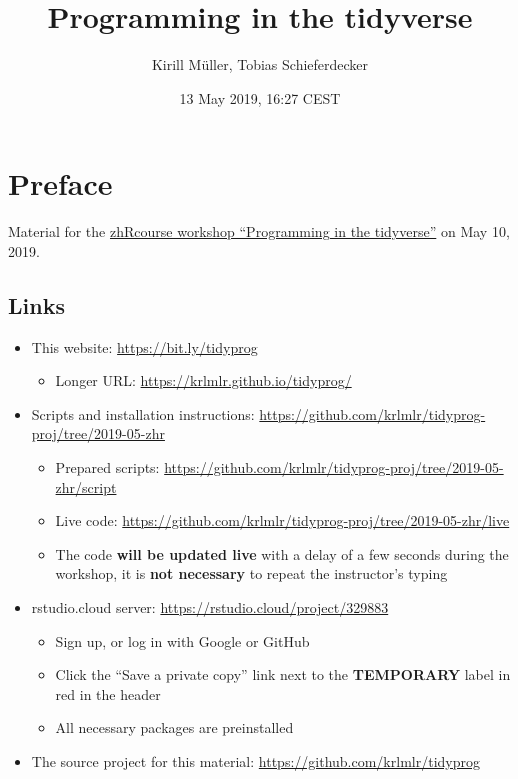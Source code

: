 \documentclass[]{book}
\title{Programming in the tidyverse}
\author{Kirill Müller, Tobias Schieferdecker}
\date{13 May 2019, 16:27 CEST}
\providecommand{\tightlist}{%
  \setlength{\itemsep}{0pt}\setlength{\parskip}{0pt}}
\begin{document}
\maketitle

{
\setcounter{tocdepth}{1}
\tableofcontents
}
\hypertarget{preface}{%
\chapter*{Preface}\label{preface}}

Material for the \href{https://www.zhrcourses.uzh.ch/en/programm2019/tidyverse.html}{zhRcourse workshop ``Programming in the tidyverse''} on May 10, 2019.

\hypertarget{links}{%
\section*{Links}\label{links}}

\begin{itemize}
\tightlist
\item
  This website: \url{https://bit.ly/tidyprog}

  \begin{itemize}
  \tightlist
  \item
    Longer URL: \url{https://krlmlr.github.io/tidyprog/}
  \end{itemize}
\item
  Scripts and installation instructions: \url{https://github.com/krlmlr/tidyprog-proj/tree/2019-05-zhr}

  \begin{itemize}
  \tightlist
  \item
    Prepared scripts: \url{https://github.com/krlmlr/tidyprog-proj/tree/2019-05-zhr/script}
  \item
    Live code: \url{https://github.com/krlmlr/tidyprog-proj/tree/2019-05-zhr/live}
  \item
    The code \textbf{will be updated live} with a delay of a few seconds during the workshop, it is \textbf{not necessary} to repeat the instructor's typing
  \end{itemize}
\item
  rstudio.cloud server: \url{https://rstudio.cloud/project/329883}

  \begin{itemize}
  \tightlist
  \item
    Sign up, or log in with Google or GitHub
  \item
    Click the ``Save a private copy'' link next to the \textbf{TEMPORARY} label in red in the header
  \item
    All necessary packages are preinstalled
  \end{itemize}
\item
  The source project for this material: \url{https://github.com/krlmlr/tidyprog}
\end{itemize}
\end{document}
